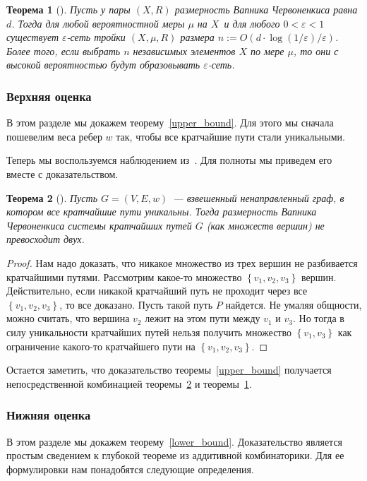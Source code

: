 \documentclass[12pt]{article}
\newcommand{\eps}{\varepsilon}
\newcommand{\set}[1]{\left\{#1\right\}}
\DeclareRobustCommand*{\CC}{\,\textendash\,\hskip 0pt}
\newtheorem{theorem}{Теорема}
\begin{document}
    \begin{theorem}[\cite{HW86}]
        \label{full_epsilon_net}
        Пусть у пары $(X, R)$ размерность Вапника\CC Червоненкиса равна $d$. Тогда для любой вероятностной меры $\mu$ на $X$\
        и для любого $0 < \varepsilon < 1$ существует $\varepsilon$-сеть тройки $(X, \mu, R)$ размера
        $n := O(d \cdot \log(1 / \varepsilon) / \varepsilon)$.
        Более того, если выбрать $n$ независимых элементов $X$ по мере $\mu$, то они с высокой вероятностью будут
        образовывать $\eps$-сеть.
    \end{theorem}
    \subsubsection{Верхняя оценка}
    \label{subsubsection_upper_bound}
    В этом разделе мы докажем теорему~\ref{upper_bound}.
    Для этого мы сначала пошевелим веса ребер $w$ так, чтобы все кратчайшие пути стали уникальными.

    Теперь мы воспользуемся наблюдением из~\cite{ADFGW11}. Для полноты мы приведем его вместе с доказательством.
    \begin{theorem}[\cite{ADFGW11}]
        \label{unique_vc_dimension}
        Пусть $G = (V, E, w)$~--- взвешенный ненаправленный граф, в котором все кратчайшие пути уникальны.
        Тогда размерность Вапника\CC Червоненкиса системы кратчайших путей $G$ (как множеств вершин)
        не превосходит двух.
    \end{theorem}
    \begin{proof}
        Нам надо доказать, что никакое множество из трех вершин не разбивается кратчайшими путями.
        Рассмотрим какое-то множество $\set{v_1, v_2, v_3}$ вершин.
        Действительно, если никакой кратчайший путь не проходит через все $\set{v_1, v_2, v_3}$, то все доказано.
        Пусть такой путь $P$ найдется. Не умаляя общности, можно считать, что вершина $v_2$ лежит на этом пути между
        $v_1$ и $v_3$. Но тогда в силу уникальности кратчайших путей нельзя получить множество $\set{v_1, v_3}$
        как ограничение какого-то кратчайшего пути на $\set{v_1, v_2, v_3}$.
    \end{proof}

    Остается заметить, что доказательство теоремы~\ref{upper_bound} получается непосредственной комбинацией
    теоремы~\ref{unique_vc_dimension} и теоремы~\ref{full_epsilon_net}.
    \subsubsection{Нижняя оценка}
    \label{subsubsection_lower_bound}
    В этом разделе мы докажем теорему~\ref{lower_bound}.
    Доказательство является простым сведением к глубокой теореме из аддитивной комбинаторики. Для ее формулировки нам
    понадобятся следующие определения.
\end{document}
